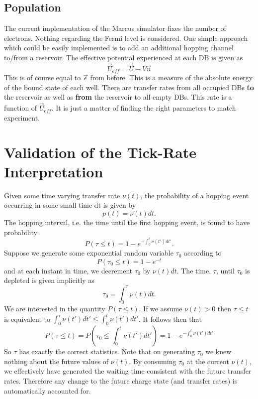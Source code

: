 \documentclass[11pt]{article}
\begin{document}
\subsection{Population}

The current implementation of the Marcus simulator fixes the number of electrons. Nothing regarding the Fermi level is considered. One simple approach which could be easily implemented is to add an additional hopping channel to/from a reservoir. The effective potential experienced at each DB is given as
\begin{equation}
\vec{U}_{eff} = \vec{U} - V \vec{n}
\end{equation}
This is of course equal to $\vec{\epsilon}$ from before. This is a measure of the absolute energy of the bound state of each well. There are transfer rates from all occupied DBs \textbf{to} the reservoir as well as \textbf{from} the reservoir to all empty DBs. This rate is a function of $\vec{U}_{eff}$. It is just a matter of finding the right parameters to match experiment.






\clearpage
\appendix

\section{Validation of the Tick-Rate Interpretation}
\label{app:tickrate}

Given some time varying transfer rate $\nu(t)$, the probability of a hopping event occurring in some small time dt is given by 
\begin{equation}
p(t) = \nu(t) dt.
\end{equation}
The hopping interval, i.e. the time until the first hopping event, is found to have probability
\begin{equation}
P(\tau \leq t) = 1-e^{-\int_0^t \nu(t')dt'}.
\end{equation}
Suppose we generate some exponential random variable $\tau_0$ according to
\begin{equation}
P(\tau_0 \leq t) = 1-e^{-t}
\end{equation}
and at each instant in time, we decrement $\tau_0$ by $\nu(t)dt$. The time, $\tau$, until $\tau_0$ is depleted is given implicitly as
\begin{equation}
\tau_0 = \int_0^\tau \nu(t) dt.
\end{equation}
We are interested in the quantity $P(\tau \leq t)$. If we assume $\nu(t)>0$ then $\tau \leq t$ is equivalent to $\int_0^\tau \nu(t') dt' \leq \int_0^t \nu(t')dt'$. It follows then that
\begin{equation}
P(\tau \leq t) = P\left( \tau_0 \leq \int_0^t \nu(t')dt' \right) = 1-e^{-\int_0^t \nu(t')dt'}
\end{equation}
So $\tau$ has exactly the correct statistics. Note that on generating $\tau_0$ we knew nothing about the future values of $\nu(t)$. By consuming $\tau_0$ at the current $\nu(t)$, we effectively have generated the waiting time consistent with the future transfer rates. Therefore any change to the future charge state (and transfer rates) is automatically accounted for.
\end{document}
